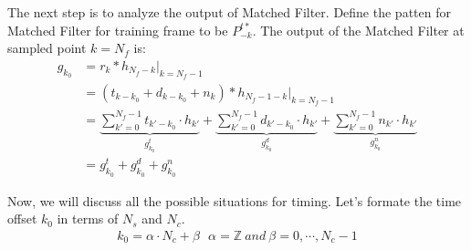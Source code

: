 \documentclass[a4paper]{article}
\begin{document}
The next step is to analyze the output of Matched Filter. 
Define the patten for Matched Filter for training frame to be $P^{t*}_{-k}$.
The output of the Matched Filter at sampled point $k=N_f$ is:
\begin{align}
	g_{k_0} 
	&= r_k \ast h_{N_f - k} \bigg|_{k = N_f-1}\\
	&= (t_{k - k_0} + d_{k - k_0} + n_k) \ast h_{N_f -1- k} \bigg|_{k = N_f-1}\\
	&= \underbrace{\sum_{k' = 0}^{N_f-1} t_{k'-k_0}\cdot h_{k'}}_{g^t_{k_0}} + \underbrace{\sum_{k' = 0}^{N_f-1} d_{k'-k_0}\cdot h_{k'}}_{g^d_{k_0}} + \underbrace{\sum_{k' = 0}^{N_f-1} n_{k'}\cdot h_{k'}}_{g^n_{k_0}}\\
	&= g^t_{k_0} + g^d_{k_0} + g^n_{k_0}
\end{align}

Now, we will discuss all the possible situations for timing. 
Let's formate the time offset $k_0$ in terms of $N_s$ and $N_c$.
\begin{align}
	k_0 = \alpha \cdot N_c + \beta ~~~ \alpha = \mathbb{Z}~and~\beta = 0, \cdots, N_c - 1
\end{align}
\end{document}

